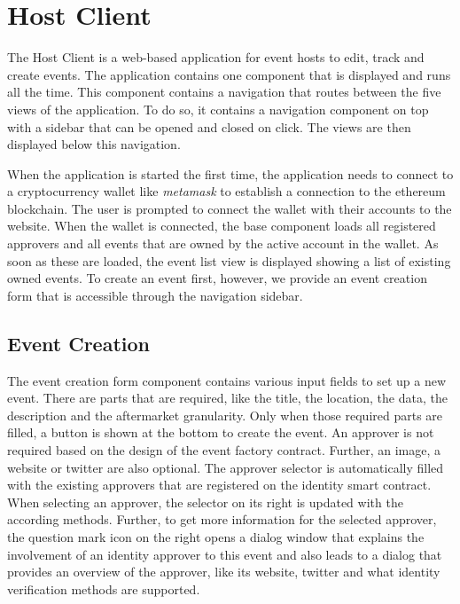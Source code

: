\section{Host Client}

The Host Client is a web-based application for event hosts to edit, track and create events. The application contains one component that is displayed and runs all the time. This component contains a navigation that routes between the five views of the application. To do so, it contains a navigation component on top with a sidebar that can be opened and closed on click. The views are then displayed below this navigation.

When the application is started the first time, the application needs to connect to a cryptocurrency wallet like \textit{metamask} to establish a connection to the ethereum blockchain. The user is prompted to connect the wallet with their accounts to the website. When the wallet is connected, the base component loads all registered approvers and all events that are owned by the active account in the wallet. As soon as these are loaded, the event list view is displayed showing a list of existing owned events. To create an event first, however, we provide an event creation form that is accessible through the navigation sidebar.

\subsection{Event Creation}
The event creation form component contains various input fields to set up a new event. There are parts that are required, like the title, the location, the data, the description and the aftermarket granularity. Only when those required parts are filled, a button is shown at the bottom to create the event. An approver is not required based on the design of the event factory contract. Further, an image, a website or twitter are also optional. The approver selector is automatically filled with the existing approvers that are registered on the identity smart contract. When selecting an approver, the selector on its right is updated with the according methods. Further, to get more information for the selected approver, the question mark icon on the right opens a dialog window that explains the involvement of an identity approver to this event and also leads to a dialog that provides an overview of the approver, like its website, twitter and what identity verification methods are supported.

